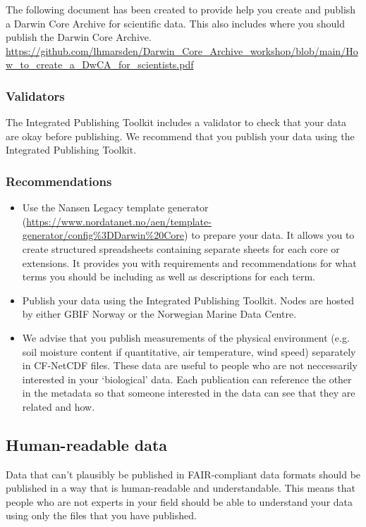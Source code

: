 \documentclass[a4paper,12pt]{article}
\begin{document}
The following document has been created to provide help you create and publish a Darwin Core Archive for scientific data. This also includes where you should publish the Darwin Core Archive.
\url{https://github.com/lhmarsden/Darwin_Core_Archive_workshop/blob/main/How_to_create_a_DwCA_for_scientists.pdf}

\subsubsection{Validators}

The Integrated Publishing Toolkit includes a validator to check that your data are okay before publishing. We recommend that you publish your data using the Integrated Publishing Toolkit.

\subsubsection{Recommendations}

\begin{itemize}
\item Use the Nansen Legacy template generator (\url{https://www.nordatanet.no/aen/template-generator/config%3DDarwin%20Core}) to prepare your data. It allows you to create structured spreadsheets containing separate sheets for each core or extensions. It provides you with requirements and recommendations for what terms you should be including as well as descriptions for each term.
\item Publish your data using the Integrated Publishing Toolkit. Nodes are hosted by either GBIF Norway or the Norwegian Marine Data Centre.
\item We advise that you publish measurements of the physical environment (e.g. soil moisture content if quantitative, air temperature, wind speed) separately in CF-NetCDF files. These data are useful to people who are not neccessarily interested in your `biological' data. Each publication can reference the other in the metadata so that someone interested in the data can see that they are related and how.
\end{itemize}

\subsection{Human-readable data}
\label{sec:humanreadable}

Data that can't plausibly be published in FAIR-compliant data formats should be published in a way that is human-readable and understandable. This means that people who are not experts in your field should be able to understand your data using only the files that you have published. 
\end{document}
